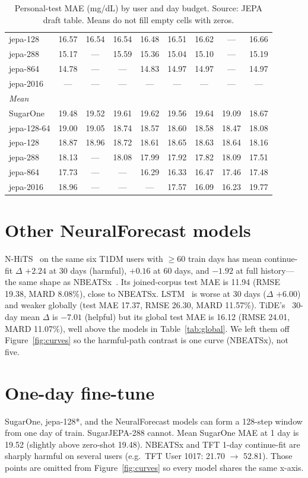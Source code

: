 \documentclass[11pt,a4paper]{article}
\begin{document}
\begin{table}[h]
\begin{tabular}{lcccccccc}
jepa-128 & 16.57 & 16.54 & 16.54 & 16.48 & 16.51 & 16.62 & --- & 16.66 \\
jepa-288 & 15.17 & --- & 15.59 & 15.36 & 15.04 & 15.10 & --- & 15.19 \\
jepa-864 & 14.78 & --- & --- & 14.83 & 14.97 & 14.97 & --- & 14.97 \\
jepa-2016 & --- & --- & --- & --- & --- & --- & --- & --- \\
\midrule
\multicolumn{9}{l}{\textit{Mean}} \\
SugarOne & 19.48 & 19.52 & 19.61 & 19.62 & 19.56 & 19.64 & 19.09 & 18.67 \\
jepa-128-64 & 19.00 & 19.05 & 18.74 & 18.57 & 18.60 & 18.58 & 18.47 & 18.08 \\
jepa-128 & 18.87 & 18.96 & 18.72 & 18.61 & 18.65 & 18.63 & 18.64 & 18.16 \\
jepa-288 & 18.13 & --- & 18.08 & 17.99 & 17.92 & 17.82 & 18.09 & 17.51 \\
jepa-864 & 17.73 & --- & --- & 16.29 & 16.33 & 16.47 & 17.46 & 17.48 \\
jepa-2016 & 18.96 & --- & --- & --- & 17.57 & 16.09 & 16.23 & 19.77 \\
\bottomrule
\end{tabular}
\caption{Personal-test MAE (mg/dL) by user and day budget. Source: JEPA
draft table. Means do not fill empty cells with zeros.}
\label{tab:all-ft}
\end{table}

\section{Other NeuralForecast models}
\label{app:nf}

N-HiTS~\citep{challu2023nhits} on the same six T1DM users with \(\ge\)60
train days has mean continue-fit \(\Delta\) \(+2.24\) at 30 days (harmful),
\(+0.16\) at 60 days, and \(-1.92\) at full history---the same shape as
NBEATSx~\citep{olivares2023nbeatsx}. Its joined-corpus test MAE is 11.94
(RMSE 19.38, MARD 8.08\%), close to NBEATSx. LSTM~\citep{hochreiter1997lstm}
is worse at 30 days (\(\Delta\) \(+6.00\)) and weaker globally (test MAE
17.37, RMSE 26.30, MARD 11.57\%).
TiDE's~\citep{das2023tide} 30-day mean \(\Delta\) is \(-7.01\) (helpful) but its global test MAE
is 16.12 (RMSE 24.01, MARD 11.07\%), well above the models in
Table~\ref{tab:global}. We left them off Figure~\ref{fig:curves} so the
harmful-path contrast is one curve (NBEATSx), not five.

\section{One-day fine-tune}
\label{app:oneday}

SugarOne, jepa-128*, and the NeuralForecast models can form a 128-step window
from one day of train. SugarJEPA-288 cannot. Mean SugarOne MAE at 1 day is
19.52 (slightly above zero-shot 19.48). NBEATSx and TFT 1-day continue-fit
are sharply harmful on several users (e.g.\ TFT User 1017: 21.70
\(\rightarrow\) 52.81). Those points are omitted from Figure~\ref{fig:curves}
so every model shares the same x-axis.
\end{document}
